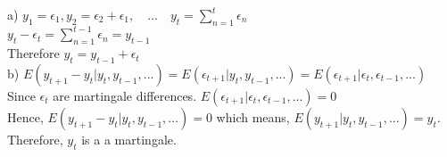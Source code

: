 \documentclass[11pt]{article}
\newenvironment{problem}[2][Problem]{\begin{trivlist}
\item[\hskip \labelsep {\bfseries #1}\hskip \labelsep {\bfseries #2.}]}{\end{trivlist}}
\begin{document}
\begin{problem}{3}
\end{problem}
a) $y_1 = \epsilon_1, y_2 = \epsilon_2+\epsilon_1,\quad ... \quad  y_t = \sum_{n = 1}^{t} \epsilon_n$\\
$y_t - \epsilon_t = \sum_{n = 1}^{t-1} \epsilon_n = y_{t-1}$\\
Therefore $y_t = y_{t-1}+\epsilon_t$\\

b) $E(y_{t+1} - y_t|y_t,y_{t-1},...) = E(\epsilon_{t+1}|y_t,y_{t-1},... ) = E(\epsilon_{t+1}|\epsilon_t,\epsilon_{t-1},... ) $\\
Since {$\epsilon_t$} are martingale differences. $E(\epsilon_{t+1}|\epsilon_t,\epsilon_{t-1},... ) = 0$\\
Hence, $E(y_{t+1} - y_t|y_t,y_{t-1},...) = 0$ which means, $E(y_{t+1}|y_t,y_{t-1},...) = y_t$.\\
Therefore, {$y_t$} is a a martingale. 
\end{document}
